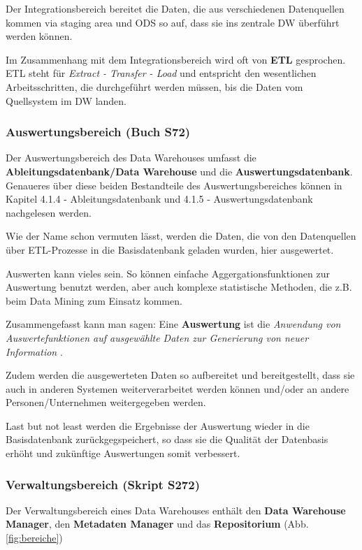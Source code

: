 \documentclass[a4paper, 11pt, nofootinbib]{article}
\begin{document}
Der Integrationsbereich bereitet die Daten, die aus verschiedenen Datenquellen kommen via staging area und ODS so auf, dass sie ins zentrale DW überführt werden können. 

Im Zusammenhang mit dem Integrationsbereich wird oft von \textbf{ETL} gesprochen. ETL steht für \textit{Extract - Transfer - Load} und entspricht den wesentlichen Arbeitsschritten, die durchgeführt werden müssen, bis die Daten vom Quellsystem im DW landen.



\subsubsection{Auswertungsbereich (Buch S72)}
Der Auswertungsbereich des Data Warehouses umfasst die \textbf{Ableitungsdatenbank/Data Warehouse} und die \textbf{Auswertungsdatenbank}. Genaueres über diese beiden Bestandteile des Auswertungsbereiches können in Kapitel 4.1.4 - Ableitungsdatenbank und 4.1.5 - Auswertungsdatenbank nachgelesen werden.

\vspace{10px}

\noindent Wie der Name schon vermuten lässt, werden die Daten, die von den Datenquellen über ETL-Prozesse in die Basisdatenbank geladen wurden, hier ausgewertet. 

Auswerten kann vieles sein. So können einfache Aggergationsfunktionen zur Auswertung benutzt werden, aber auch komplexe statistische Methoden, die z.B. beim Data Mining zum Einsatz kommen.

Zusammengefasst kann man sagen: Eine \textbf{Auswertung} ist die \textit{Anwendung von Auswertefunktionen auf ausgewählte Daten zur Generierung von neuer Information} .

Zudem werden die ausgewerteten Daten so aufbereitet und bereitgestellt, dass sie auch in anderen Systemen weiterverarbeitet werden können und/oder an andere Personen/Unternehmen weitergegeben werden.

Last but not least werden die Ergebnisse der Auswertung wieder in die Basisdatenbank zurückgegspeichert, so dass sie die Qualität der Datenbasis erhöht und zukünftige Auswertungen somit verbessert. 


\subsubsection{Verwaltungsbereich (Skript S272)}
Der Verwaltungsbereich eines Data Warehouses enthält den \textbf{Data Warehouse Manager}, den \textbf{Metadaten Manager} und das \textbf{Repositorium} (Abb. \ref{fig:bereiche})
\end{document}
